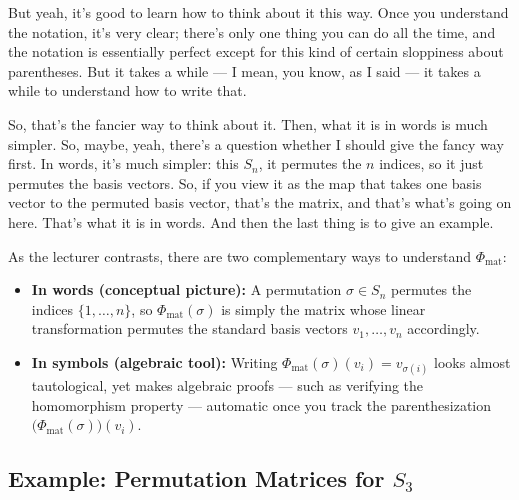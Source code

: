 \begin{speech}[00:12:46 - 00:13:40]
But yeah, it's good to learn how to think about it this way. Once you understand the notation, it's very clear; there's only one thing you can do all the time, and the notation is essentially perfect except for this kind of certain sloppiness about parentheses. But it takes a while --- I mean, you know, as I said --- it takes a while to understand how to write that.

So, that's the fancier way to think about it. Then, what it is in words is much simpler. So, maybe, yeah, there's a question whether I should give the fancy way first. In words, it's much simpler: this $S_n$, it permutes the $n$ indices, so it just permutes the basis vectors. So, if you view it as the map that takes one basis vector to the permuted basis vector, that's the matrix, and that's what's going on here. That's what it is in words. And then the last thing is to give an example.
\end{speech}

\begin{insight}
As the lecturer contrasts, there are two complementary ways to understand $\Phi_{\text{mat}}$:
\begin{itemize}
    \item \textbf{In words (conceptual picture):} A permutation $\sigma \in S_n$ permutes the indices $\{1, \dots, n\}$, so $\Phi_{\text{mat}}(\sigma)$ is simply the matrix whose linear transformation permutes the standard basis vectors $v_1, \dots, v_n$ accordingly.
    \item \textbf{In symbols (algebraic tool):} Writing $\Phi_{\text{mat}}(\sigma)(v_i) = v_{\sigma(i)}$ looks almost tautological, yet makes algebraic proofs --- such as verifying the homomorphism property --- automatic once you track the parenthesization $\bigl(\Phi_{\text{mat}}(\sigma)\bigr)(v_i)$.
\end{itemize}
\end{insight}

\begin{hidden}
\end{hidden}

\subsection{Example: Permutation Matrices for \texorpdfstring{$S_3$}{S\_3}}


